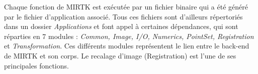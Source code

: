\documentclass[10pt]{report}
\begin{document}
	Chaque fonction de MIRTK est exécutée par un fichier binaire qui a été généré par le fichier d'application associé. Tous ces fichiers sont d'ailleurs répertoriés dans un dossier \textit{Applications} et font appel à certaines dépendances, qui sont réparties en 7 modules : \textit{Common, Image, I/O, Numerics, PointSet, Registration} et \textit{Transformation}. Ces différents modules représentent le lien entre le back-end de MIRTK et son corps. Le recalage d'image (Registration) est l'une de ses principales fonctions. %
	
	
	

\end{document}
